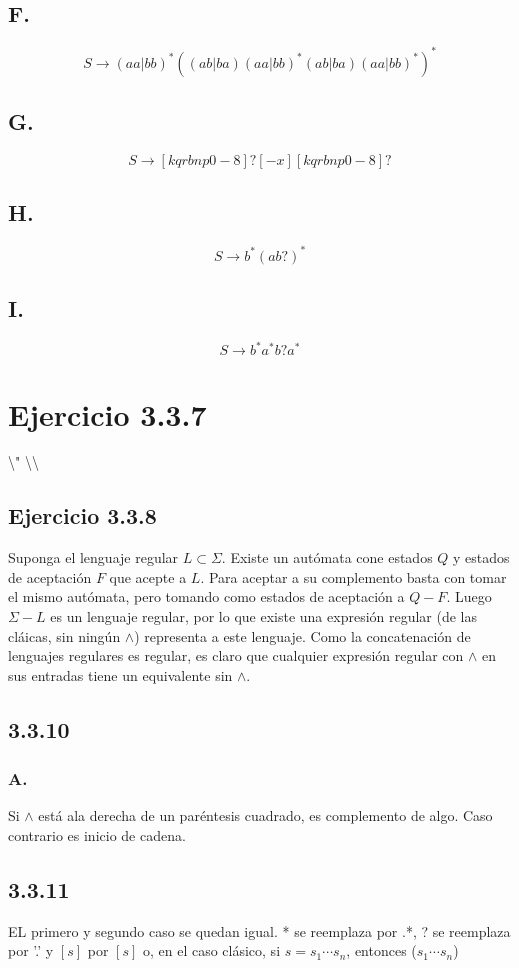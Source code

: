 \documentclass{article}
\begin{document}
\subsection*{F.}
$$S \rightarrow (aa|bb)^*((ab|ba)(aa|bb)^*(ab|ba)(aa|bb)^*)^*$$
\subsection*{G.}
$$S \rightarrow [kqrbnp0-8]?[-x][kqrbnp0-8]?$$
\subsection*{H.}
$$ S \rightarrow b^* (ab?)^*$$
\subsection*{I.}
$$S \rightarrow b^* a ^* b? a^*$$
\section*{Ejercicio 3.3.7}
\textbackslash " \textbackslash \textbackslash
\subsection*{Ejercicio 3.3.8}
Suponga el lenguaje regular $L \subset \Sigma$. Existe un autómata cone estados $Q$ y estados de aceptación $F$ que acepte a $L$. Para aceptar a su complemento basta con tomar el mismo autómata, pero tomando como estados de aceptación a $Q-F$. Luego $\Sigma - L$ es un lenguaje regular, por lo que existe una expresión regular (de las cláicas, sin ningún $\wedge$) representa a este lenguaje. Como la concatenación de lenguajes regulares es regular, es claro que cualquier expresión regular con $\wedge$ en sus entradas tiene un equivalente sin $\wedge$. 
\subsection*{3.3.10}
\subsubsection*{A.} Si $\wedge$ está ala derecha de un paréntesis cuadrado, es complemento de algo. Caso contrario es inicio de cadena.
\subsection*{3.3.11}
EL primero y segundo caso se quedan igual. * se reemplaza por .*, ? se reemplaza por '.' y $[s]$ por $[s]$ o, en el caso clásico, si $s=s_1 \cdots s_n$, entonces ($s_1 \cdots s_n$)
\end{document}
